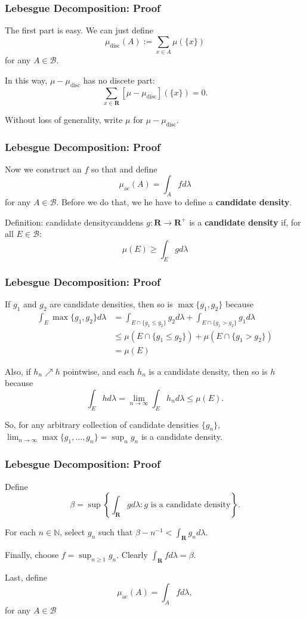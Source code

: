 \documentclass[handout]{beamer}
\begin{document}
\frame
{
\frametitle{Lebesgue Decomposition: Proof} 

The first part is easy. We can just define 
$$
\mu_{\text{disc}} ( A ) := \sum_{x \in A} \mu(\{x\})
$$
for any $A \in \mathcal{B}$.
\newline

In this way, $\mu - \mu_{\text{disc}}$ has no discete part:
$$
\sum_{x \in \mathbf{R}} \left[\mu - \mu_{\text{disc}}\right](\{x\}) = 0.
$$

Without loss of generality, write $\mu$ for $\mu - \mu_{\text{disc}}$.
}


\frame
{
\frametitle{Lebesgue Decomposition: Proof} 

Now we construct an $f$ so that and define
$$
\mu_{\text{ac}}(A) = \int_A f d\lambda
$$
for any $A \in \mathcal{B}$. Before we do that, we he have to define a { \bf candidate density}.

\begin{mytheo}{Definition: candidate density}{canddens}
$g : \mathbf{R} \to \mathbf{R}^+$ is a {\bf candidate density} if, for all $E \in \mathcal{B}$:
$$
\mu(E) \ge \int_E g d\lambda
$$
\end{mytheo}

}


\frame
{
\frametitle{Lebesgue Decomposition: Proof} 

If $g_1$ and $g_2$ are candidate densities, then so is $\max\{g_1,g_2\}$ because
\begin{align*}
\int_E \max\{g_1,g_2\} d\lambda 
&= \int_{E \cap \{g_1 \le g_2\}} g_2 d\lambda + \int_{E \cap \{g_1 > g_2\}} g_1 d\lambda \\ 
&\le \mu(E \cap \{g_1 \le g_2\}) + \mu(E \cap \{g_1 > g_2\}) \\
&= \mu(E)
\end{align*}

Also, if $h_n \nearrow h$ pointwise, and each $h_n$ is a candidate density, then so is $h$ because
$$
\int_E h d\lambda = \lim_{n \to \infty}\int_E h_n d\lambda \le \mu(E).
$$

So, for any arbitrary collection of candidate densities $\{g_n\}$, $\lim_{n \to \infty} \max\{g_1, \ldots, g_n \} = \sup_n g_n$ is a candidate density.

}

\frame
{
\frametitle{Lebesgue Decomposition: Proof} 

Define 
$$
\beta = \sup \left\{ \int_{\mathbf{R}} g d\lambda : g \text{ is a candidate density} \right\}.
$$

For each $n \in \mathbb{N}$, select $g_n$ such that $\beta - n^{-1} < \int_{\mathbf{R}} g_n d \lambda$.
\newline

Finally, choose $f = \sup_{n \ge 1} g_n$. Clearly $\int_{\mathbf{R}} f d\lambda = \beta$. 
\newline

Last, define
$$
\mu_{\text{ac}}(A) = \int_A f d\lambda,
$$
for any $A \in \mathcal{B}$


}
\end{document}
